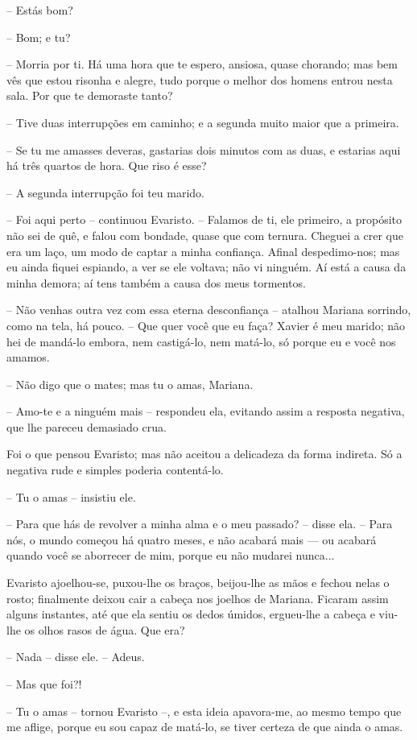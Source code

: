 -- Estás bom?

-- Bom; e tu?

-- Morria por ti. Há uma hora que te espero, ansiosa, quase chorando;
mas bem vês que estou risonha e alegre, tudo porque o melhor dos homens
entrou nesta sala. Por que te demoraste tanto?

-- Tive duas interrupções em caminho; e a segunda muito maior que a
primeira.

-- Se tu me amasses deveras, gastarias dois minutos com as duas, e
estarias aqui há três quartos de hora. Que riso é esse?

-- A segunda interrupção foi teu marido.

-- Foi aqui perto -- continuou Evaristo. -- Falamos de ti, ele primeiro,
a propósito não sei de quê, e falou com bondade, quase que com ternura.
Cheguei a crer que era um laço, um modo de captar a minha confiança.
Afinal despedimo-nos; mas eu ainda fiquei espiando, a ver se ele
voltava; não vi ninguém. Aí está a causa da minha demora; aí tens também
a causa dos meus tormentos.

-- Não venhas outra vez com essa eterna desconfiança -- atalhou Mariana
sorrindo, como na tela, há pouco. -- Que quer você que eu faça? Xavier é
meu marido; não hei de mandá-lo embora, nem castigá-lo, nem matá-lo, só
porque eu e você nos amamos.

-- Não digo que o mates; mas tu o amas, Mariana.

-- Amo-te e a ninguém mais -- respondeu ela, evitando assim a resposta
negativa, que lhe pareceu demasiado crua.

Foi o que pensou Evaristo; mas não aceitou a delicadeza da forma
indireta. Só a negativa rude e simples poderia contentá-lo.

-- Tu o amas -- insistiu ele.

-- Para que hás de revolver a minha alma e o meu passado? -- disse ela.
-- Para nós, o mundo começou há quatro meses, e não acabará mais --- ou
acabará quando você se aborrecer de mim, porque eu não mudarei nunca...

Evaristo ajoelhou-se, puxou-lhe os braços, beijou-lhe as mãos e fechou
nelas o rosto; finalmente deixou cair a cabeça nos joelhos de Mariana.
Ficaram assim alguns instantes, até que ela sentiu os dedos úmidos,
ergueu-lhe a cabeça e viu-lhe os olhos rasos de água. Que era?

-- Nada -- disse ele. -- Adeus.

-- Mas que foi?!

-- Tu o amas -- tornou Evaristo --, e esta ideia apavora-me, ao mesmo
tempo que me aflige, porque eu sou capaz de matá-lo, se tiver certeza de
que ainda o amas.

